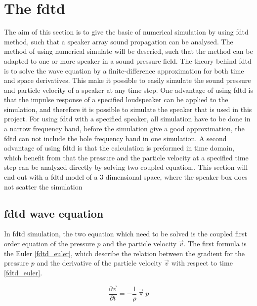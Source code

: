 \section{The \gls{fdtd}}
The aim of this section is to give the basic of numerical simulation by using \gls{fdtd} method, such that a speaker array sound propagation can be analysed. The method of using numerical simulate will be descried, such that the method can be adapted to one or more speaker in a sound pressure field. 
The theory behind \gls{fdtd} is to solve the wave equation by a finite-difference approximation for both time and space derivatives. This make it possible to easily simulate the sound pressure and particle velocity of a speaker at any time step. One advantage of using \gls{fdtd} is that the impulse response of a specified loudspeaker can be applied to the simulation, and therefore it is possible to simulate the speaker that is used in this project. For using \gls{fdtd} with a specified speaker, all simulation have to be done in a narrow frequency band, before the simulation give a good approximation, the \gls{fdtd} can not include the hole frequency band in one simulation. A second advantage of using \gls{fdtd} is that the calculation is preformed in time domain, which benefit from that the pressure and the particle velocity at a specified time step can be analyzed directly by solving two coupled equation.\citep{fdtddaga}. This section will end out with a \gls{fdtd} model of a 3 dimensional space, where the speaker box does not scatter the simulation \\

\subsection{\gls{fdtd} wave equation}
In \gls{fdtd} simulation, the two equation which need to be solved is the coupled first order equation of the pressure $p$ and the particle velocity $\vec{v}$. The first formula is the Euler \autoref{fdtd_euler}, which describe the relation between the gradient for the pressure $p$ and the derivative of the particle velocity $\vec{v}$ with respect to time \autoref{fdtd_euler}. 

\begin{equation}\label{fdtd_euler}
\frac{\partial \vec{v}}{\partial t} =- \frac{1}{\rho}\vec{\triangledown }p
\end{equation}

    \startexplain
    \stopexplain

